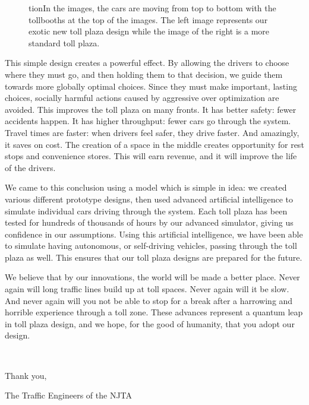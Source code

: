 \documentclass[a4paper, 11pt]{article}
\begin{document}
\begin{figure}[H]
tion{In the images, the cars are moving from top to bottom with the tollbooths at the top of the images. The left image represents our exotic new toll plaza design while the image of the right is a more standard toll plaza.}
\label{two_types}
\end{figure}

This simple design creates a powerful effect. By allowing the drivers to choose where they must go, and then holding them to that decision, we guide them towards more globally optimal choices. Since they must make important, lasting choices, socially harmful actions caused by aggressive over optimization are avoided. This improves the toll plaza on many fronts. It has better safety: fewer accidents happen. It has higher throughput: fewer cars go through the system. Travel times are faster: when drivers feel safer, they drive faster. And amazingly, it saves on cost. The creation of a space in the middle creates opportunity for rest stops and convenience stores. This will earn revenue, and it will improve the life of the drivers. 

We came to this conclusion using a model which is simple in idea: we created various different prototype designs, then used advanced artificial intelligence to simulate individual cars driving through the system. Each toll plaza has been tested for hundreds of thousands of hours by our advanced simulator, giving us confidence in our assumptions. Using this artificial intelligence, we have been able to simulate having autonomous, or self-driving vehicles, passing through the toll plaza as well. This ensures that our toll plaza designs are prepared for the future. 

We believe that by our innovations, the world will be made a better place. Never again will long traffic lines build up at toll spaces. Never again will it be slow. And never again will you not be able to stop for a break after a harrowing and horrible experience through a toll zone. These advances represent a quantum leap in toll plaza design, and we hope, for the good of humanity, that you adopt our design.

\

Thank you, 

The Traffic Engineers of the NJTA

\newpage





\end{document}
